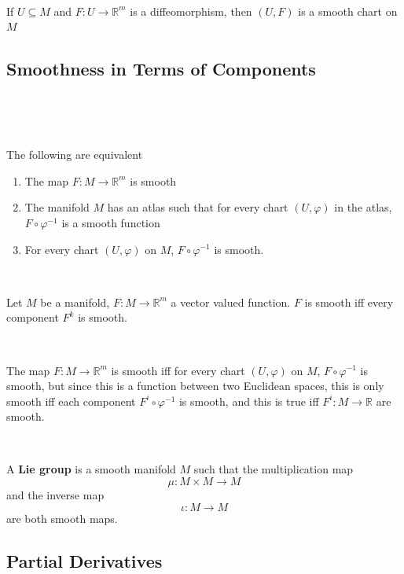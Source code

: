 \documentclass{article}
\begin{document}
\begin{proposition}
  \

  If $U \subseteq M$ and $F: U \to \mathbb{R}^m$ is a diffeomorphism, then $(U, F)$ is a smooth chart on $M$
\end{proposition}

\subsection{Smoothness in Terms of Components}
\

\begin{proposition}
  \

  The following are equivalent

  \begin{enumerate}
    \item The map $F: M \to \mathbb{R}^m$ is smooth
    \item The manifold $M$ has an atlas such that for every chart $(U,\varphi)$ in the atlas, $F \circ \varphi ^{-1}$ is a smooth function
    \item For every chart $(U, \varphi)$ on $M$, $F \circ \varphi ^{-1}$ is smooth.
  \end{enumerate}
\end{proposition}

\begin{proposition}
  \

  Let $M$ be a manifold, $F: M \to \mathbb{R}^m$ a vector valued function. $F$ is smooth iff every component $F^k$ is smooth.
\end{proposition}

\begin{customproof}
  \

  The map $F: M \to \mathbb{R}^m$ is smooth iff for every chart $(U, \varphi)$ on $M$, $F \circ \varphi ^{-1}$ is smooth, but since this is a function between two Euclidean spaces, this is only smooth iff each component $F^i \circ \varphi ^{-1}$ is smooth, and this is true iff $F^i: M \to \mathbb{R}$ are smooth.
\end{customproof}

\begin{definition}
  \

  A \textbf{Lie group} is a smooth manifold $M$ such that the multiplication map $$\mu: M \times M \to M$$ and the inverse map $$\iota: M \to M$$are both smooth maps.
\end{definition}

\subsection{Partial Derivatives}
\
\end{document}
